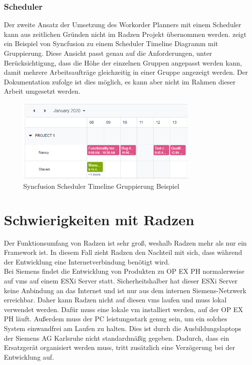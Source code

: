 \subsubsection{Scheduler}
Der zweite Ansatz der Umsetzung des Workorder Planners mit einem Scheduler kann aus zeitlichen Gründen nicht im Radzen Projekt übernommen werden.  zeigt ein Beispiel von Syncfusion zu einem Scheduler Timeline Diagramm mit Gruppierung. Diese Ansicht passt genau auf die Anforderungen, unter Berücksichtigung, dass die Höhe der einzelnen Gruppen angepasst werden kann, damit mehrere Arbeitsaufträge gleichzeitig in einer Gruppe angezeigt werden. Der Dokumentation zufolge ist dies möglich, es kann aber nicht im Rahmen dieser Arbeit umgesetzt werden.

\begin{figure}[htbp]
  \centering
  \includegraphics[width=0.8\textwidth]{img/wo_planner-timeline}
  \caption{\label{fig-wo_planner_timeline}Syncfusion Scheduler Timeline Gruppierung Beispiel}
\end{figure}

\section{Schwierigkeiten mit Radzen}
Der Funktionsumfang von Radzen ist sehr groß, weshalb Radzen mehr als nur ein Framework ist. In diesem Fall zieht Radzen den Nachteil mit sich, dass während der Entwicklung eine Internetverbindung benötigt wird.\\
Bei Siemens findet die Entwicklung von Produkten zu \gls{OP EX PH} normalerweise auf \glspl{vm} auf einem \gls{ESXi} Server statt. Sicherheitshalber hat dieser \gls{ESXi} Server keine Anbindung an das Internet und ist nur aus dem internen Siemens-Netzwerk erreichbar. Daher kann Radzen nicht auf diesen \glspl{vm} laufen und muss lokal verwendet werden. Dafür muss eine lokale \gls{vm} installiert werden, auf der \gls{OP EX PH} läuft. Außerdem muss der PC leistungsstark genug sein, um ein solches System einwandfrei am Laufen zu halten. Dies ist durch die Ausbildungslaptops der Siemens AG Karlsruhe nicht standardmäßig gegeben. Dadurch, dass ein Ersatzgerät organisiert werden muss, tritt zusätzlich eine Verzögerung bei der Entwicklung auf.

